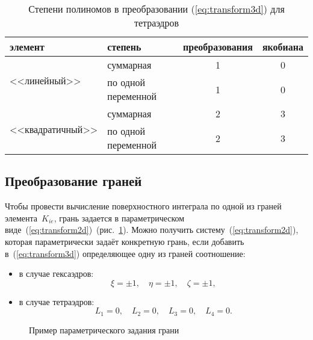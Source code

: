 \begin{table}[ht]
	\centering
	\caption{Степени полиномов в преобразовании (\ref{eq:transform3d}) для тетраэдров}
	\label{tab:transformorder:tetra}
	\smallskip
	\begin{tabular}{l l c c}
		\toprule
		элемент                           & степень             & преобразования & якобиана \\
		\midrule
		\multirow{2}{*}{<<линейный>>}     & суммарная           & 1              & 0 \\
		                                  & по одной переменной & 1              & 0 \\
		\midrule
		\multirow{2}{*}{<<квадратичный>>} & суммарная           & 2              & 3 \\
		                                  & по одной переменной & 2              & 3 \\
		\bottomrule
	\end{tabular}
\end{table}



\subsection{Преобразование граней} \label{subsect:paramfaces}

Чтобы провести вычисление поверхностного интеграла по одной из граней элемента~\(K_{ie}\), грань задается в параметрическом виде~(\ref{eq:transform2d})~(рис.~\ref{pic:parametricsurf}). Можно получить систему~(\ref{eq:transform2d}), которая параметрически задаёт конкретную грань, если добавить в~(\ref{eq:transform3d}) определяющее одну из граней соотношение:
\begin{itemize}
	\item в случае гексаэдров:
	\[\xi = \pm 1,\quad \eta = \pm 1,\quad \zeta = \pm 1,\]
	\item в случае тетраэдров:
	\[L_1 = 0,\quad L_2 = 0,\quad L_3 = 0,\quad L_4 = 0.\]
\end{itemize}

\begin{figure}[h]
	{\centering
		\hfill
		\hfill
		\hfill
	}
	\caption{Пример параметрического задания грани}
	\label{pic:parametricsurf}
\end{figure}

